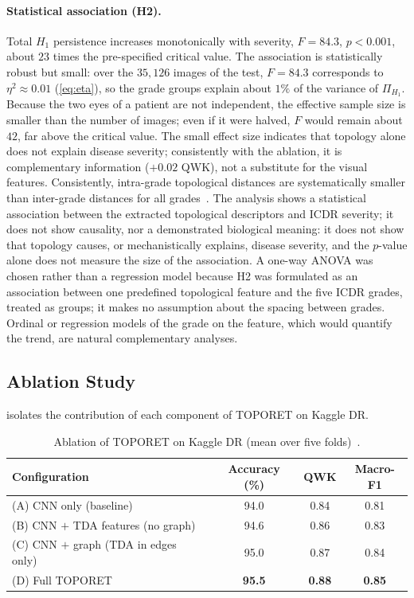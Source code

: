 \paragraph{Statistical association (H2).}
Total $H_1$ persistence increases monotonically with severity, $F=84.3$, $p<0.001$, about
$23$ times the pre-specified critical value. The association is statistically robust but
small: over the $35{,}126$ images of the test, $F=84.3$ corresponds to $\eta^2\approx0.01$
(\cref{eq:eta}), so the grade groups explain about $1\%$ of the variance of $\Pi_{H_1}$.
Because the two eyes of a patient are not independent, the effective sample size is smaller
than the number of images; even if it were halved, $F$ would remain about $42$, far above
the critical value. The small effect size indicates that topology alone does not explain
disease severity; consistently with the ablation, it is complementary information
($+0.02$ QWK), not a substitute for the visual features. Consistently, intra-grade
topological distances are systematically smaller than inter-grade distances for all
grades~\cite{belhadj2025plos}. The analysis shows a statistical association between the extracted topological
descriptors and ICDR severity; it does not show causality, nor a demonstrated biological
meaning: it does not show that topology causes, or mechanistically explains, disease
severity, and
the $p$-value alone does not measure the size of the association. A one-way ANOVA was chosen
rather than a regression model because H2 was formulated as an association between one
predefined topological feature and the five ICDR grades, treated as groups; it makes no
assumption about the spacing between grades. Ordinal or regression models of the grade on
the feature, which would quantify the trend, are natural complementary analyses.

\subsection{Ablation Study}
\label{sec:ablation3}

 isolates the contribution of each component of TOPORET on Kaggle DR.

\begin{table}[H]
\centering
\caption[Ablation of TOPORET]{Ablation of TOPORET on Kaggle DR (mean over five
folds)~\cite{belhadj2025plos}.}
\label{tab:ablation3}
\small
\begin{tabular}{@{}lccc@{}}
\toprule
Configuration & Accuracy (\%) & QWK & Macro-F1 \\
\midrule
(A) CNN only (baseline) & 94.0 & 0.84 & 0.81 \\
(B) CNN $+$ TDA features (no graph) & 94.6 & 0.86 & 0.83 \\
(C) CNN $+$ graph (TDA in edges only) & 95.0 & 0.87 & 0.84 \\
(D) Full TOPORET & \textbf{95.5} & \textbf{0.88} & \textbf{0.85} \\
\bottomrule
\end{tabular}
\end{table}

